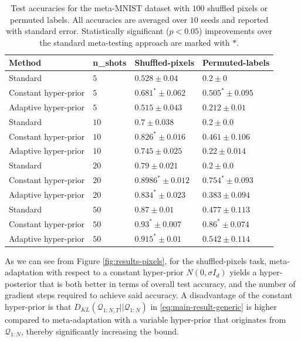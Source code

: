 \documentclass[letterpaper]{article} %
\theoremstyle{definition}
\begin{document}
\begin{table}[t]	
	
	\centering
	\begin{tabular}{llll}
		\toprule
		Method   & n\_shots  & Shuffled-pixels & Permuted-labels  \\
		\midrule
		Standard & $5$   & $0.528\pm 0.04 $   & $0.2\pm 0 $   \\
		Constant hyper-prior & $5$   & $0.681^*\pm 0.062 $ & $0.505^*\pm 0.095 $ \\
		Adaptive hyper-prior & $5$   & $0.515\pm 0.043 $ & $0.212\pm 0.01 $ \\
		\midrule
		Standard & $10$   & $0.7\pm 0.038 $   & $0.2\pm 0.0 $   \\
		Constant hyper-prior & $10$   & $0.826^*\pm 0.016 $ & $0.461\pm 0.106 $ \\
		Adaptive hyper-prior & $10$   & $0.745\pm 0.025 $ & $0.22\pm 0.014 $ \\
		\midrule
		Standard & $20$   & $0.79\pm 0.021 $   & $0.2\pm 0.0 $   \\
		Constant hyper-prior & $20$   & $0.8986^*\pm 0.012 $ & $0.754^*\pm 0.093 $ \\
		Adaptive hyper-prior & $20$   & $0.834^*\pm 0.023 $ & $0.383\pm 0.094 $ \\
		\midrule
		Standard & $50$   & $0.87\pm 0.01 $   & $0.477\pm 0.113 $   \\
		Constant hyper-prior & $50$   & $0.93^*\pm 0.007 $ & $0.86^*\pm 0.074 $ \\
		Adaptive hyper-prior & $50$   & $0.915^*\pm 0.01 $ & $0.542\pm 0.114 $ \\
		\midrule
		\bottomrule
	\end{tabular}
	\caption{Test accuracies for the meta-MNIST dataset with $100$ shuffled pixels or permuted labels. All accuracies are averaged over $10$ seeds and reported with standard error. Statistically significant ($p<0.05$) improvements over the standard meta-testing approach are marked with $*$.}
	\label{table:gamma}
\end{table}

As we can see from Figure \ref{fig:results-pixels}, for the shuffled-pixels task, meta-adaptation with respect to a constant hyper-prior $N(0,\sigma I_d)$ yields a hyper-posterior that is both better in terms of overall test accuracy, and the number of gradient steps required to achieve said accuracy. A disadvantage of the constant hyper-prior is that $D_{KL}(\mathcal{Q}_{1:N,T}||\mathcal{Q}_{1:N})$ in \eqref{eq:main-result-generic} is higher compared to meta-adaptation with a variable hyper-prior that originates from $\mathcal{Q}_{1:N}$, thereby significantly increasing the bound.
\end{document}
